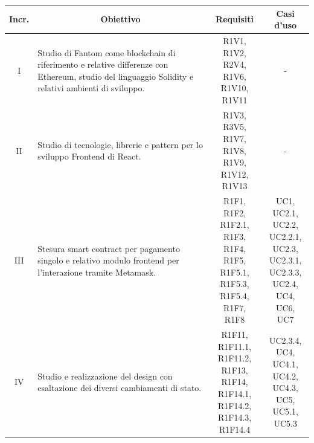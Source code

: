 \begin{table}[H]
  \centering
  \renewcommand{\arraystretch}{1.8}
  \begin{tabular}{c|p{6cm}|c|c}
    \rowcolor[HTML]{125E28}
    \color[HTML]{FFFFFF}\textbf{Incr.}
    & \multicolumn{1}{c}{\color[HTML]{FFFFFF}\textbf{Obiettivo}}
    & \multicolumn{1}{c}{\color[HTML]{FFFFFF}\textbf{Requisiti}}
    & \multicolumn{1}{c}{\color[HTML]{FFFFFF}\textbf{Casi d'uso}}\\
    \hline
    I	& Studio di Fantom\glo{} come blockchain\glo{} di riferimento e relative differenze con Ethereum\glo{}, studio del linguaggio Solidity\glo{} e relativi ambienti di sviluppo.	& \Shortunderstack{R1V1, R1V2,\\R2V4, R1V6,\\R1V10, R1V11\\} & - \\
    II & Studio di tecnologie, librerie e pattern per lo sviluppo Frontend\glo{} di React. & \Shortunderstack{R1V3, R3V5,\\R1V7, R1V8,\\R1V9, R1V12,\\R1V13\\} & - \\
    III	& Stesura smart contract\glo{} per pagamento singolo e relativo modulo frontend\glo{} per l'interazione tramite Metamask\glo{}. & \Shortunderstack{R1F1, R1F2,\\R1F2.1, R1F3,\\R1F4, R1F5,\\R1F5.1, R1F5.3,\\R1F5.4, R1F7,\\R1F8\\} & \Shortunderstack{UC1, UC2.1,\\UC2.2, UC2.2.1,\\UC2.3, UC2.3.1,\\UC2.3.3, UC2.4,\\UC4, UC6,\\UC7\\}\\
    IV & Studio e realizzazione del design con esaltazione dei diversi cambiamenti di stato. & \Shortunderstack{R1F11, R1F11.1,\\R1F11.2, R1F13,\\R1F14, R1F14.1,\\R1F14.2, R1F14.3,\\R1F14.4\\} & \Shortunderstack{UC2.3.4, UC4,\\UC4.1, UC4.2,\\UC4.3, UC5,\\UC5.1, UC5.3\\}\\

\end{tabular}
\end{table}
